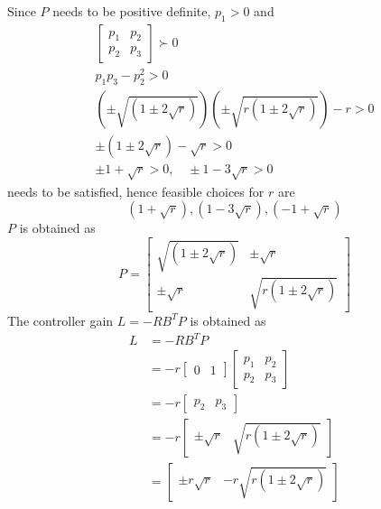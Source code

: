 Since $P$ needs to be positive definite, $p_1>0$ and
\begin{equation}
\begin{split}
\begin{bmatrix}
    p_1& p_2\\p_2& p_3
\end{bmatrix}\succ 0\\
p_1p_3-p_2^2>0\\
(\pm\sqrt{(1\pm2\sqrt{r})})(\pm\sqrt{r(1\pm2\sqrt{r})})-r>0\\
\pm(1\pm2\sqrt{r})-\sqrt{r}>0\\
\pm1+\sqrt{r}>0,\quad\pm1-3\sqrt{r}>0
\end{split}
\end{equation}
needs to be satisfied, hence feasible choices for $r$ are 
\begin{equation}
    (1+\sqrt{r}),(1-3\sqrt{r}),(-1+\sqrt{r})
\end{equation}
$P$ is obtained as
\begin{equation}
P=\begin{bmatrix}
    \sqrt{(1\pm2\sqrt{r})}& \pm\sqrt{r}\\
    \pm\sqrt{r}& \sqrt{r(1\pm2\sqrt{r})}
\end{bmatrix}
\end{equation}
The controller gain $L=-RB^TP$ is obtained as 
\begin{equation}
\begin{split}
    L&=-RB^TP\\
    &=-r\begin{bmatrix}0& 1\end{bmatrix}\begin{bmatrix}p_1&p_2\\p_2& p_3\end{bmatrix}\\
    &=-r\begin{bmatrix}p_2& p_3\end{bmatrix}\\
    &=-r\begin{bmatrix}\pm\sqrt{r}& \sqrt{r(1\pm2\sqrt{r})}\end{bmatrix}\\
    &=\begin{bmatrix}\pm r\sqrt{r}& -r\sqrt{r(1\pm2\sqrt{r})}\end{bmatrix}\\
\end{split}
\end{equation}

